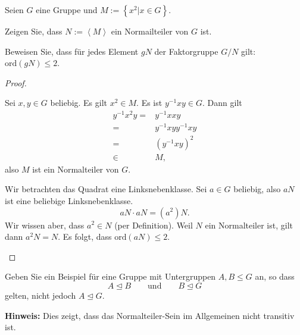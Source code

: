 \begin{Problem}
	Seien $G$ eine Gruppe und $M:=\left\{ x^2|x\in G \right\} $.
	\begin{parts}
	\item Zeigen Sie, dass $N:=\left<M \right>$ ein Normailteiler von $G$ ist.
	\item Beweisen Sie, dass für jedes Element $gN$ der Faktorgruppe $G / N$ gilt: $\text{ord}(gN)\le 2$.
	\end{parts}
\end{Problem}
\begin{proof}
	\begin{parts}
	\item Sei $x,y\in G$ beliebig. Es gilt $x^2\in M$. Es ist $y^{-1}xy\in G$. Dann gilt
		\begin{align*}
			y^{-1}x^2y=&y^{-1}x xy\\
			=&y^{-1}xyy^{-1}xy\\
			=&(y^{-1}xy)^2\\
			\in& M,
		\end{align*}
		also $M$ ist ein Normalteiler von $G$.
	\item Wir betrachten das Quadrat eine Linksnebenklasse. Sei $a\in G$ beliebig, also $aN$ ist eine beliebige Linksnebenklasse.
		\[
		aN\cdot aN=(a^2)N
		.\] 
		Wir wissen aber, dass $a^2 \in N$ (per Definition). Weil $N$ ein Normalteiler ist, gilt dann $a^2N=N$. Es folgt, dass $\text{ord}(aN)\le 2$.\qedhere 
	\end{parts}
\end{proof}
\begin{Problem}
	Geben Sie ein Beispiel für eine Gruppe mit Untergruppen $A,B\le G$ an, so dass
	\[
		A\trianglelefteq B\qquad\text{und}\qquad B\trianglelefteq G
	\]
	gelten, nicht jedoch $A\trianglelefteq G$.

	{\footnotesize \textbf{Hinweis:} Dies zeigt, dass das Normalteiler-Sein im Allgemeinen nicht transitiv ist.}
\end{Problem}
